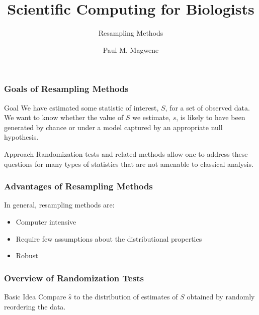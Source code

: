 \documentclass{beamer}
\title{Scientific Computing for Biologists}
\subtitle{Resampling Methods} %
\author{Paul M. Magwene}
\begin{document}
\begin{frame}
\titlepage
\end{frame}



\begin{frame}
  \frametitle{Goals of Resampling Methods}

\begin{block}{Goal}
We have estimated some statistic of interest, $S$, for a set of observed data. We want to know whether the value of $S$ we estimate, $\widehat{s}$, is likely to have been generated by chance or under a model captured by an appropriate null hypothesis.
\end{block}


\begin{block}{Approach}
Randomization tests and related methods allow one to address these questions for many types of statistics that are not amenable to classical analysis.
\end{block}


\end{frame}



\begin{frame}
  \frametitle{Advantages of Resampling Methods}


In general, resampling methods are:
\begin{itemize}
    \item Computer intensive
    \item Require few assumptions about the distributional properties
    \item Robust
\end{itemize}

\end{frame}



\begin{frame}
  \frametitle{Overview of Randomization Tests}

\begin{block}{Basic Idea}
Compare $\widehat{s}$ to the distribution of estimates of $S$ obtained by randomly reordering the data.
\end{block}

\end{frame}
\end{document}
